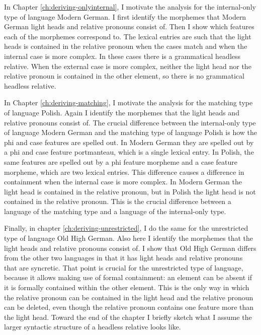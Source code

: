 In Chapter \ref{ch:deriving-onlyinternal}, I motivate the analysis for the internal-only type of language Modern German. I first identify the morphemes that Modern German light heads and relative pronouns consist of. Then I show which features each of the morphemes correspond to. The lexical entries are such that the light heads is contained in the relative pronoun when the cases match and when the internal case is more complex. In these cases there is a grammatical headless relative. When the external case is more complex, neither the light head nor the relative pronoun is contained in the other element, so there is no grammatical headless relative.

In Chapter \ref{ch:deriving-matching}, I motivate the analysis for the matching type of language Polish. Again I identify the morphemes that the light heads and relative pronouns consist of. The crucial difference between the internal-only type of language Modern German and the matching type of language Polish is how the phi and case features are spelled out. In Modern German they are spelled out by a phi and case feature portmanteau, which is a single lexical entry. In Polish, the same features are spelled out by a phi feature morpheme and a case feature morpheme, which are two lexical entries. This difference causes a difference in containment when the internal case is more complex. In Modern German the light head is contained in the relative pronoun, but in Polish the light head is not contained in the relative pronoun. This is the crucial difference between a language of the matching type and a language of the internal-only type.

Finally, in chapter \ref{ch:deriving-unrestricted}, I do the same for the unrestricted type of language Old High German. Also here I identify the morphemes that the light heads and relative pronouns consist of. I show that Old High German differs from the other two languages in that it has light heads and relative pronouns that are syncretic. That point is crucial for the unrestricted type of language, because it allows making use of formal containment: an element can be absent if it is formally contained within the other element. This is the only way in which the relative pronoun can be contained in the light head and the relative pronoun can be deleted, even though the relative pronoun contains one feature more than the light head. Toward the end of the chapter I briefly sketch what I assume the larger syntactic structure of a headless relative looks like.





